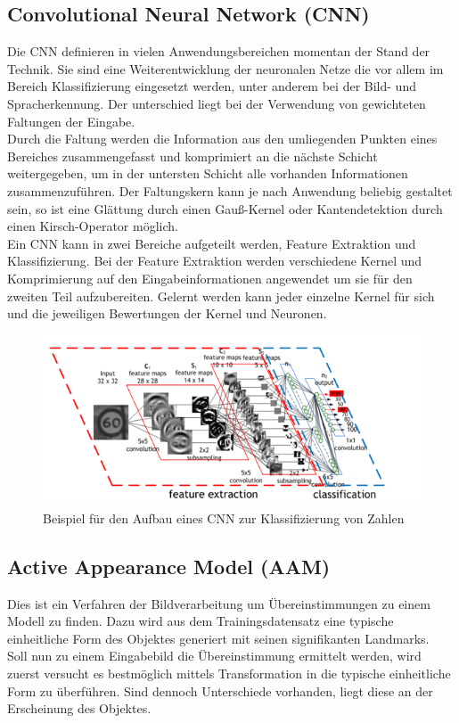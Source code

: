 \subsection{Convolutional Neural Network (CNN)}
Die CNN definieren in vielen Anwendungsbereichen momentan der Stand der Technik. Sie sind eine Weiterentwicklung der neuronalen Netze die vor allem im Bereich Klassifizierung eingesetzt werden, unter anderem bei der Bild- und Spracherkennung. Der unterschied liegt bei der Verwendung von gewichteten Faltungen der Eingabe.\\
Durch die Faltung werden die Information aus den umliegenden Punkten eines Bereiches zusammengefasst und komprimiert an die nächste Schicht weitergegeben, um in der untersten Schicht alle vorhanden Informationen zusammenzuführen. 
Der Faltungskern kann je nach Anwendung beliebig gestaltet sein, so ist eine Glättung durch einen Gauß-Kernel oder Kantendetektion durch einen Kirsch-Operator möglich.\\
Ein CNN kann in zwei Bereiche aufgeteilt werden, Feature Extraktion und Klassifizierung. Bei der Feature Extraktion werden verschiedene Kernel und Komprimierung auf den Eingabeinformationen angewendet um sie für den zweiten Teil aufzubereiten.
Gelernt werden kann jeder einzelne Kernel für sich und die jeweiligen Bewertungen der Kernel und Neuronen.\\
\cite{pdf_CNN}\cite{wiki_CNN}
\begin{figure}
	\centering
	\includegraphics[width=0.7\linewidth]{img/cnn}
	\caption{Beispiel für den Aufbau eines CNN zur Klassifizierung von Zahlen \cite{bild_CNN}}
	\label{img_cnn}
\end{figure}
\subsection{Active Appearance Model (AAM)}
Dies ist ein Verfahren der Bildverarbeitung um Übereinstimmungen zu einem Modell zu finden. Dazu wird aus dem Trainingsdatensatz eine typische einheitliche Form des Objektes generiert mit seinen signifikanten Landmarks.\\
Soll nun zu einem Eingabebild die Übereinstimmung ermittelt werden, wird zuerst versucht es bestmöglich mittels Transformation in die typische einheitliche Form zu überführen. Sind dennoch Unterschiede vorhanden, liegt diese an der Erscheinung des Objektes.\\
\cite{wiki_AAM}
